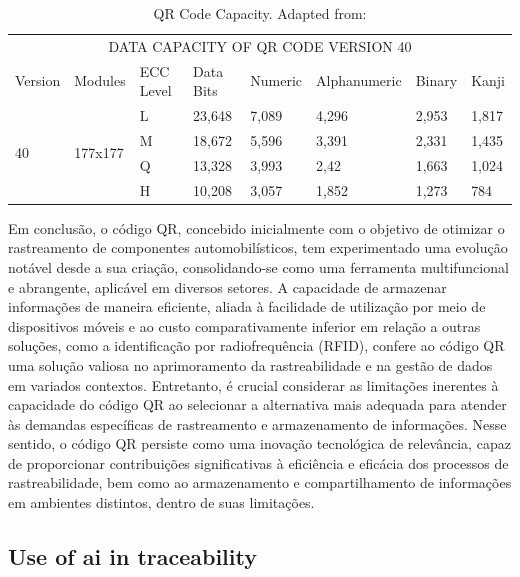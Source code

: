 \begin{table}[h]
\begin{tabular}{llllllll}
\hline
\multicolumn{8}{c}{DATA CAPACITY OF QR CODE VERSION 40 } \\
\cline{1-8}

Version             & Modules                  & ECC Level & Data Bits & Numeric & Alphanumeric & Binary & Kanji \\
\cline{1-8}


\multirow{4}{*}{40} & \multirow{4}{*}{177x177} & L         & 23,648    & 7,089   & 4,296        & 2,953 & 1,817 \\
                    &                          & M         & 18,672    & 5,596   & 3,391        & 2,331 & 1,435 \\
                    &                          & Q         & 13,328    & 3,993   & 2,42         & 1,663 & 1,024 \\
                    &                          & H         & 10,208    & 3,057   & 1,852        & 1,273 & 784 \\
\cline{1-8}
\end{tabular}
\caption{QR Code Capacity. Adapted from: \cite{Tiwari2016}}
\label{tab:qrcode-capacity}
\end{table}

Em conclusão, o código QR, concebido inicialmente com o objetivo de otimizar o rastreamento de componentes automobilísticos, tem experimentado uma evolução notável desde a sua criação, consolidando-se como uma ferramenta multifuncional e abrangente, aplicável em diversos setores. A capacidade de armazenar informações de maneira eficiente, aliada à facilidade de utilização por meio de dispositivos móveis e ao custo comparativamente inferior em relação a outras soluções, como a identificação por radiofrequência (RFID), confere ao código QR uma solução valiosa no aprimoramento da rastreabilidade e na gestão de dados em variados contextos. Entretanto, é crucial considerar as limitações inerentes à capacidade do código QR ao selecionar a alternativa mais adequada para atender às demandas específicas de rastreamento e armazenamento de informações. Nesse sentido, o código QR persiste como uma inovação tecnológica de relevância, capaz de proporcionar contribuições significativas à eficiência e eficácia dos processos de rastreabilidade, bem como ao armazenamento e compartilhamento de informações em ambientes distintos, dentro de suas limitações.


\subsection{Use of \acrshort{ai} in traceability}\label{ArtificialIntelligencetraceability}

